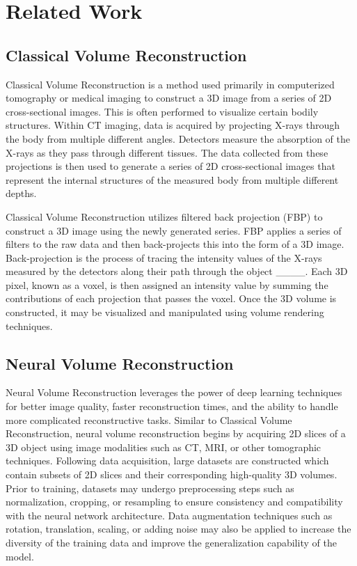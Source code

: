 \section{Related Work}
\subsection{Classical Volume Reconstruction}

Classical Volume Reconstruction is a method used primarily in computerized tomography or medical imaging to construct a 3D image from a series of 2D cross-sectional images. This is often performed to visualize certain bodily structures. Within CT imaging, data is acquired by projecting X-rays through the body from multiple different angles. Detectors measure the absorption of the X-rays as they pass through different tissues. The data collected from these projections is then used to generate a series of 2D cross-sectional images that represent the internal structures of the measured body from multiple different depths. 

Classical Volume Reconstruction utilizes filtered back projection (FBP) to construct a 3D image using the newly generated series. FBP applies a series of filters to the raw data and then back-projects this into the form of a 3D image. Back-projection is the process of tracing the intensity values of the X-rays measured by the detectors along their path through the object ____. Each 3D pixel, known as a voxel, is then assigned an intensity value by summing the contributions of each projection that passes the voxel. Once the 3D volume is constructed, it may be visualized and manipulated using volume rendering techniques.  


\subsection{Neural Volume Reconstruction}

Neural Volume Reconstruction leverages the power of deep learning techniques for better image quality, faster reconstruction times, and the ability to handle more complicated reconstructive tasks. Similar to Classical Volume Reconstruction, neural volume reconstruction begins by acquiring 2D slices of a 3D object using image modalities such as CT, MRI, or other tomographic techniques. Following data acquisition, large datasets are constructed which contain subsets of 2D slices and their corresponding high-quality 3D volumes. Prior to training, datasets may undergo preprocessing steps such as normalization, cropping, or resampling to ensure consistency and compatibility with the neural network architecture. Data augmentation techniques such as rotation, translation, scaling, or adding noise may also be applied to increase the diversity of the training data and improve the generalization capability of the model.

